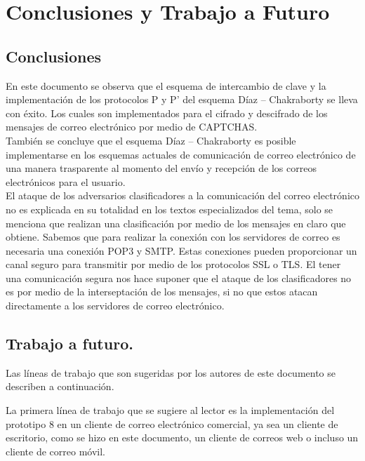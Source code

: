 \chapter{Conclusiones y Trabajo a Futuro}
\section{Conclusiones}

En este documento se observa que el esquema de intercambio de clave y la implementación de los protocolos P y P’ del esquema Díaz – Chakraborty se lleva con éxito. Los cuales son implementados para el cifrado y descifrado de los mensajes de correo electrónico por medio de CAPTCHAS. \\

También se concluye que el esquema Díaz – Chakraborty es posible implementarse en los esquemas actuales de comunicación de correo electrónico de una manera trasparente al momento del envío y recepción de los correos electrónicos para el usuario.\\

El ataque de los adversarios clasificadores a la comunicación del correo electrónico no es explicada en su totalidad en los textos especializados del tema, solo se menciona que realizan una clasificación por medio de los mensajes en claro que obtiene. Sabemos que para realizar la conexión con los servidores de correo es necesaria una conexión POP3 y SMTP. Estas conexiones pueden proporcionar un canal seguro para transmitir por medio de los protocolos SSL o TLS. El tener una comunicación segura nos hace suponer que el ataque de los clasificadores no es por medio de la interseptación de los mensajes, si no que estos atacan directamente a los servidores de correo electrónico.



\section{Trabajo a futuro.}

Las líneas de trabajo que son sugeridas por los autores de este documento se describen a continuación.

La primera línea de trabajo que se sugiere al lector es la implementación del prototipo 8 en un cliente de correo electrónico comercial, ya sea un cliente de escritorio, como se hizo en este documento, un cliente de correos web o incluso un cliente de correo móvil.\\

